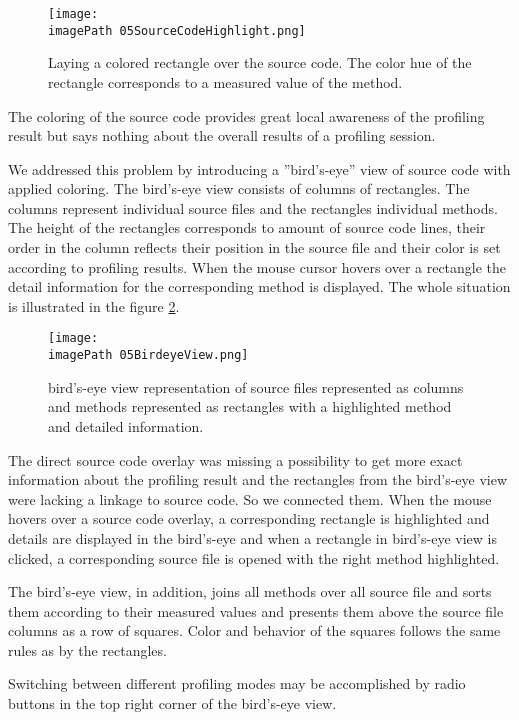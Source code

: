 \begin{figure}
	\centering
		\texttt{[image: \\imagePath 05SourceCodeHighlight.png]}
		\caption{Laying a colored rectangle over the source code. The color hue of the rectangle corresponds to a measured value of the method. }
	\label{fig:05SourceCodeHighlight}
\end{figure}

The coloring of the source code provides great local awareness of the profiling result but says nothing about the overall results of a profiling session. 

We addressed this problem by introducing a ''bird's-eye'' view of source code with applied coloring. The bird's-eye view consists of columns of rectangles. The columns represent individual source files and the rectangles individual methods. The height of the rectangles corresponds to amount of source code lines, their order in the column reflects their position in the source file and their color is set according to profiling results.
When the mouse cursor hovers over a rectangle the detail information for the corresponding method is displayed. The whole situation is illustrated in the figure \ref{fig:05BirdeyeView}.

\begin{figure}
	\centering
		\texttt{[image: \\imagePath 05BirdeyeView.png]}
		\caption{bird's-eye view representation of source files represented as columns and methods represented as rectangles with a highlighted method and detailed information. }
	\label{fig:05BirdeyeView}
\end{figure}

The direct source code overlay was missing a possibility to get more exact information about the profiling result and the rectangles from the bird's-eye view were lacking a linkage to source code. So we connected them. When the mouse hovers over a source code overlay, a corresponding rectangle is highlighted and details are displayed in the bird's-eye and when a rectangle in bird's-eye view is clicked, a corresponding source file is opened  with the right method highlighted. 

The bird's-eye view, in addition, joins all methods over all source file and sorts them according to their measured values and presents them above the source file columns as a row of squares. Color and behavior of the squares follows the same rules as by the rectangles.

Switching between different profiling modes may be accomplished by radio buttons in the top right corner of the bird's-eye view.

